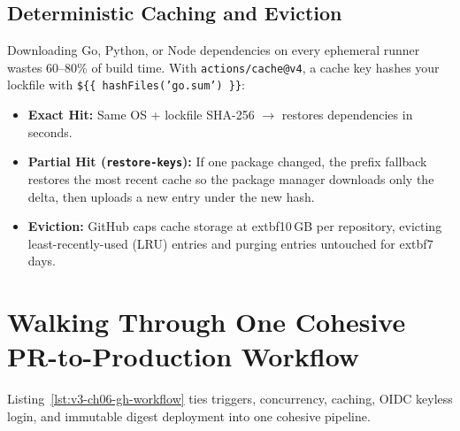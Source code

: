 \subsection{Deterministic Caching and Eviction}
Downloading Go, Python, or Node dependencies on every ephemeral runner wastes 60--80\% of build time. With \texttt{actions/cache@v4}, a cache key hashes your lockfile with \texttt{\$\{\{ hashFiles('go.sum') \}\}}:
\begin{itemize}[leftmargin=12pt]
  \item \textbf{Exact Hit:} Same OS + lockfile SHA-256 $\to$ restores dependencies in seconds.
  \item \textbf{Partial Hit (\texttt{restore-keys}):} If one package changed, the prefix fallback restores the most recent cache so the package manager downloads only the delta, then uploads a new entry under the new hash.
  \item \textbf{Eviction:} GitHub caps cache storage at 	extbf{10\,GB per repository}, evicting least-recently-used (LRU) entries and purging entries untouched for 	extbf{7 days}.
\end{itemize}

\section{Walking Through One Cohesive PR-to-Production Workflow}

Listing~\ref{lst:v3-ch06-gh-workflow} ties triggers, concurrency, caching, OIDC keyless login, and immutable digest deployment into one cohesive pipeline.

